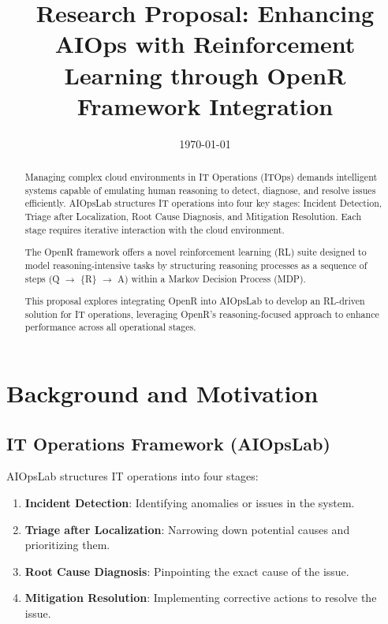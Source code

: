 \documentclass[conference]{IEEEtran}
\begin{document}
\title{Research Proposal: Enhancing AIOps with Reinforcement Learning through OpenR Framework Integration}

\author{
}

\date{\today}

\maketitle

\begin{abstract}
    Managing complex cloud environments in IT Operations (ITOps) demands intelligent systems capable of emulating human reasoning to detect, diagnose, and resolve issues efficiently. 
    AIOpsLab structures IT operations into four key stages: Incident Detection, Triage after Localization, Root Cause Diagnosis, and Mitigation Resolution.
    Each stage requires iterative interaction with the cloud environment.

    The OpenR framework offers a novel reinforcement learning (RL) suite designed to model reasoning-intensive tasks by structuring reasoning processes as a sequence of steps (Q $\rightarrow$ \{R\} $\rightarrow$ A) within a Markov Decision Process (MDP). 
    
    This proposal explores integrating OpenR into AIOpsLab to develop an RL-driven solution for IT operations, leveraging OpenR's reasoning-focused approach to enhance performance across all operational stages.
\end{abstract}

\section{Background and Motivation}

\subsection{IT Operations Framework (AIOpsLab)}
AIOpsLab structures IT operations into four stages:
\begin{enumerate}
    \item \textbf{Incident Detection}: Identifying anomalies or issues in the system.
    \item \textbf{Triage after Localization}: Narrowing down potential causes and prioritizing them.
    \item \textbf{Root Cause Diagnosis}: Pinpointing the exact cause of the issue.
    \item \textbf{Mitigation Resolution}: Implementing corrective actions to resolve the issue.
\end{enumerate}
\end{document}
